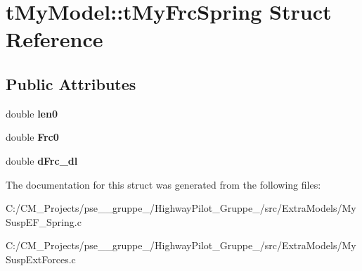 \hypertarget{structt_my_model_1_1t_my_frc_spring}{}\section{t\+My\+Model\+::t\+My\+Frc\+Spring Struct Reference}
\label{structt_my_model_1_1t_my_frc_spring}
\subsection*{Public Attributes}
\begin{DoxyCompactItemize}
\item 
\mbox{\label{structt_my_model_1_1t_my_frc_spring_a32a11d92696b589cb620a97dfbedd13d}} 
double {\bfseries len0}
\item 
\mbox{\label{structt_my_model_1_1t_my_frc_spring_a341aa686aaed23a6965aeafc93049200}} 
double {\bfseries Frc0}
\item 
\mbox{\label{structt_my_model_1_1t_my_frc_spring_a7d3255fb738d06918d1050796cdc4639}} 
double {\bfseries d\+Frc\+\_\+dl}
\end{DoxyCompactItemize}


The documentation for this struct was generated from the following files\+:\begin{DoxyCompactItemize}
\item 
C\+:/\+C\+M\+\_\+\+Projects/pse\+\_\+\_\+gruppe\+\_/\+Highway\+Pilot\+\_\+\+Gruppe\+\_/src/\+Extra\+Models/My\+Susp\+E\+F\+\_\+\+Spring.\+c\item 
C\+:/\+C\+M\+\_\+\+Projects/pse\+\_\+\_\+gruppe\+\_/\+Highway\+Pilot\+\_\+\+Gruppe\+\_/src/\+Extra\+Models/My\+Susp\+Ext\+Forces.\+c\end{DoxyCompactItemize}
